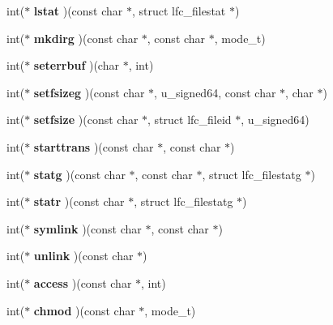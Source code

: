 \begin{DoxyCompactItemize}
\item 
int($\ast$ {\bfseries lstat} )(const char $\ast$, struct lfc\_\-filestat $\ast$)\label{structfc__ops_aafa993d057f725f3aeb39f59fc84de3b}

\item 
int($\ast$ {\bfseries mkdirg} )(const char $\ast$, const char $\ast$, mode\_\-t)\label{structfc__ops_aa80419ecf8c325dca26a4b357acd31a2}

\item 
int($\ast$ {\bfseries seterrbuf} )(char $\ast$, int)\label{structfc__ops_ac65c7220761740f6043d05f4daf3e1d2}

\item 
int($\ast$ {\bfseries setfsizeg} )(const char $\ast$, u\_\-signed64, const char $\ast$, char $\ast$)\label{structfc__ops_af89bf431cbbcb14ea0843610da73fadf}

\item 
int($\ast$ {\bfseries setfsize} )(const char $\ast$, struct lfc\_\-fileid $\ast$, u\_\-signed64)\label{structfc__ops_a36ac55719deefb79bad045bd240985e1}

\item 
int($\ast$ {\bfseries starttrans} )(const char $\ast$, const char $\ast$)\label{structfc__ops_a15607bd8fdcca2047c4319fca06a370e}

\item 
int($\ast$ {\bfseries statg} )(const char $\ast$, const char $\ast$, struct lfc\_\-filestatg $\ast$)\label{structfc__ops_a3caba5477cd36d2fe799aea3465ab386}

\item 
int($\ast$ {\bfseries statr} )(const char $\ast$, struct lfc\_\-filestatg $\ast$)\label{structfc__ops_a98cea5dc681134c03868ff6d1f23b7b5}

\item 
int($\ast$ {\bfseries symlink} )(const char $\ast$, const char $\ast$)\label{structfc__ops_a14563570f097da6cf8383d1a55e7fafc}

\item 
int($\ast$ {\bfseries unlink} )(const char $\ast$)\label{structfc__ops_a5cd3ad0433ef61819202084a9ecf8392}

\item 
int($\ast$ {\bfseries access} )(const char $\ast$, int)\label{structfc__ops_aa581e43c9bde72a5ffee4d571848f1f4}

\item 
int($\ast$ {\bfseries chmod} )(const char $\ast$, mode\_\-t)\label{structfc__ops_a28f923c43911266b4203245844c54a3c}


\end{DoxyCompactItemize}
